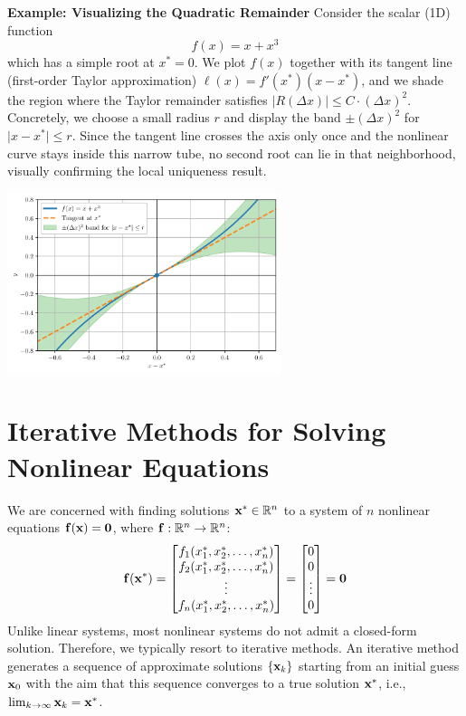 \begin{exampleBox}
\textbf{Example: Visualizing the Quadratic Remainder}
Consider the scalar (1D) function
\[
f(x) = x + x^3
\]
which has a simple root at \(x^*=0\).  We plot \(f(x)\) together with its tangent line (first-order Taylor approximation)
\(\ell(x)=f'(x^*)(x-x^*)\), and we shade the region where the Taylor remainder satisfies
\(\lvert R(\Delta x)\rvert \le C \cdot (\Delta x)^2\).  Concretely, we choose a small radius \(r\) and display
the band \(\pm(\Delta x)^2\) for \(\lvert x-x^*\rvert\le r\).  Since the tangent line crosses the axis
only once and the nonlinear curve stays inside this narrow tube, no second root can lie in that
neighborhood, visually confirming the local uniqueness result.

\begin{center}
    \includegraphics[width=0.6\textwidth]{figs/nle/tangent_band.pdf}
\end{center}
\end{exampleBox}

\section{Iterative Methods for Solving Nonlinear Equations}

We are concerned with finding solutions $\mathbf{x}^* \in \mathbb{R}^n$ to a system of $n$ nonlinear equations $\mathbf{f}(\mathbf{x}) = \mathbf{0}$, where $\mathbf{f}: \mathbb{R}^n \to \mathbb{R}^n$:
\[
    \mathbf{f}(\mathbf{x}^*) = \begin{bmatrix} f_1(x_1^*, x_2^*, \dots, x_n^*) \\ f_2(x_1^*, x_2^*, \dots, x_n^*) \\ \vdots \\ f_n(x_1^*, x_2^*, \dots, x_n^*) \end{bmatrix} = \begin{bmatrix} 0 \\ 0 \\ \vdots \\ 0 \end{bmatrix} = \mathbf{0}
\]
Unlike linear systems, most nonlinear systems do not admit a closed-form solution. Therefore, we typically resort to iterative methods. An iterative method generates a sequence of approximate solutions $\{\mathbf{x}_k\}$ starting from an initial guess $\mathbf{x}_0$ with the aim that this sequence converges to a true solution $\mathbf{x}^*$, i.e., $\lim_{k\to\infty} \mathbf{x}_k = \mathbf{x}^*$.

